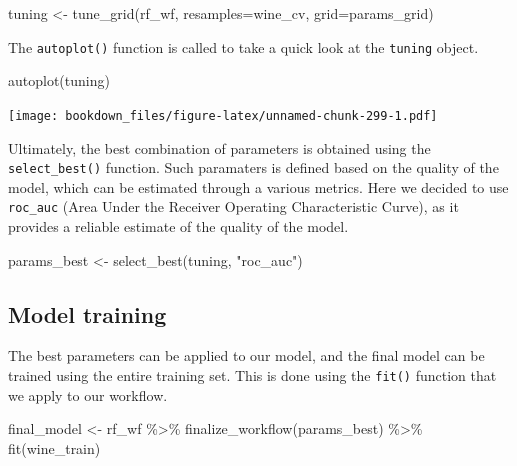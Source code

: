 \documentclass[
]{krantz}
\makeatletter
\newenvironment{Shaded}{\begin{snugshade}}{\end{snugshade}}
\newcommand{\AttributeTok}[1]{\textcolor[rgb]{0.61,0.61,0.61}{#1}}
\newcommand{\FunctionTok}[1]{\textcolor[rgb]{0,0,0}{#1}}
\newcommand{\NormalTok}[1]{#1}
\newcommand{\OtherTok}[1]{\textcolor[rgb]{0.37,0.37,0.37}{#1}}
\newcommand{\SpecialCharTok}[1]{\textcolor[rgb]{0,0,0}{#1}}
\newcommand{\StringTok}[1]{\textcolor[rgb]{0.5,0.5,0.5}{#1}}
\newenvironment{kframe}{%
\medskip{}
\setlength{\fboxsep}{.8em}
 \def\at@end@of@kframe{}%
 \ifinner\ifhmode%
  \def\at@end@of@kframe{\end{minipage}}%
  \begin{minipage}{\columnwidth}%
 \fi\fi%
 \def\FrameCommand##1{\hskip\@totalleftmargin \hskip-\fboxsep
 \colorbox{shadecolor}{##1}\hskip-\fboxsep
     \hskip-\linewidth \hskip-\@totalleftmargin \hskip\columnwidth}%
 \MakeFramed {\advance\hsize-\width
   \@totalleftmargin\z@ \linewidth\hsize
   \@setminipage}}%
 {\par\unskip\endMakeFramed%
 \at@end@of@kframe}
\renewenvironment{Shaded}{\begin{kframe}}{\end{kframe}}
\makeatother
\begin{document}
\begin{Shaded}
\begin{Highlighting}[]
\NormalTok{tuning }\OtherTok{\textless{}{-}} \FunctionTok{tune\_grid}\NormalTok{(rf\_wf, }\AttributeTok{resamples=}\NormalTok{wine\_cv, }\AttributeTok{grid=}\NormalTok{params\_grid)}
\end{Highlighting}
\end{Shaded}

The \texttt{autoplot()} function is called to take a quick look at the \texttt{tuning} object.

\begin{Shaded}
\begin{Highlighting}[]
\FunctionTok{autoplot}\NormalTok{(tuning)}
\end{Highlighting}
\end{Shaded}

\texttt{[image: bookdown\_files/figure-latex/unnamed-chunk-299-1.pdf]}

Ultimately, the best combination of parameters is obtained using the \texttt{select\_best()} function. Such paramaters is defined based on the quality of the model, which can be estimated through a various metrics. Here we decided to use \texttt{roc\_auc} (Area Under the Receiver Operating Characteristic Curve), as it provides a reliable estimate of the quality of the model.

\begin{Shaded}
\begin{Highlighting}[]
\NormalTok{params\_best }\OtherTok{\textless{}{-}} \FunctionTok{select\_best}\NormalTok{(tuning, }\StringTok{"roc\_auc"}\NormalTok{)}
\end{Highlighting}
\end{Shaded}

\hypertarget{model-training}{%
\subsection{Model training}\label{model-training}}

The best parameters can be applied to our model, and the final model can be trained using the entire training set. This is done using the \texttt{fit()} function that we apply to our workflow.

\begin{Shaded}
\begin{Highlighting}[]
\NormalTok{final\_model }\OtherTok{\textless{}{-}}\NormalTok{ rf\_wf }\SpecialCharTok{\%\textgreater{}\%}
  \FunctionTok{finalize\_workflow}\NormalTok{(params\_best) }\SpecialCharTok{\%\textgreater{}\%}
  \FunctionTok{fit}\NormalTok{(wine\_train)}
\end{Highlighting}
\end{Shaded}
\end{document}
